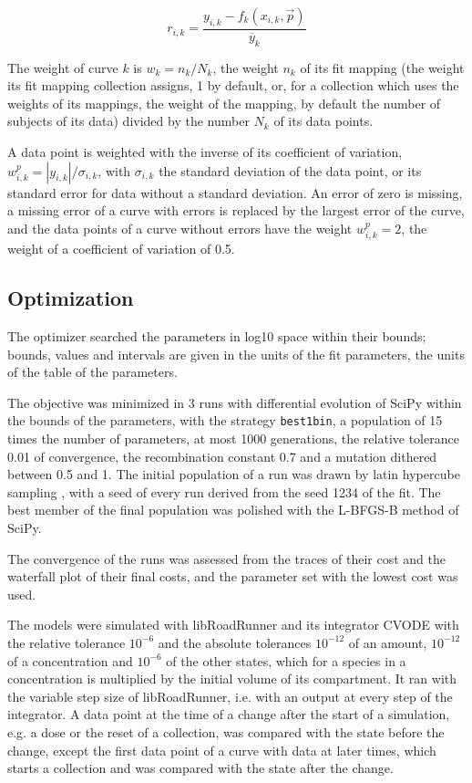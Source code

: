 \documentclass{article}
\begin{document}
\begin{equation}
r_{i,k} = \frac{y_{i,k} - f_k(x_{i,k}, \vec{p})}{\overline{y}_k}
\end{equation}

The weight of curve $k$ is $w_k = n_k / N_k$, the weight $n_k$ of its fit mapping (the weight its fit mapping collection assigns, 1 by default, or, for a collection which uses the weights of its mappings, the weight of the mapping, by default the number of subjects of its data) divided by the number $N_k$ of its data points.

A data point is weighted with the inverse of its coefficient of variation, $w^{p}_{i,k} = |y_{i,k}| / \sigma_{i,k}$, with $\sigma_{i,k}$ the standard deviation of the data point, or its standard error for data without a standard deviation. An error of zero is missing, a missing error of a curve with errors is replaced by the largest error of the curve, and the data points of a curve without errors have the weight $w^{p}_{i,k} = 2$, the weight of a coefficient of variation of 0.5.

\subsection{Optimization}

The optimizer searched the parameters in log10 space within their bounds; bounds, values and intervals are given in the units of the fit parameters, the units of the table of the parameters.

The objective was minimized in 3 runs with differential evolution \cite{Storn1997} of SciPy \cite{Virtanen2020} within the bounds of the parameters, with the strategy \texttt{best1bin}, a population of 15 times the number of parameters, at most 1000 generations, the relative tolerance 0.01 of convergence, the recombination constant 0.7 and a mutation dithered between 0.5 and 1. The initial population of a run was drawn by latin hypercube sampling \cite{McKay1979}, with a seed of every run derived from the seed 1234 of the fit. The best member of the final population was polished with the L-BFGS-B method of SciPy.

The convergence of the runs was assessed from the traces of their cost and the waterfall plot of their final costs, and the parameter set with the lowest cost was used.

The models were simulated with libRoadRunner \cite{Welsh2023} and its integrator CVODE \cite{Hindmarsh2005} with the relative tolerance $10^{-6}$ and the absolute tolerances $10^{-12}$ of an amount, $10^{-12}$ of a concentration and $10^{-6}$ of the other states, which for a species in a concentration is multiplied by the initial volume of its compartment. It ran with the variable step size of libRoadRunner, i.e. with an output at every step of the integrator. A data point at the time of a change after the start of a simulation, e.g. a dose or the reset of a collection, was compared with the state before the change, except the first data point of a curve with data at later times, which starts a collection and was compared with the state after the change.
\end{document}
